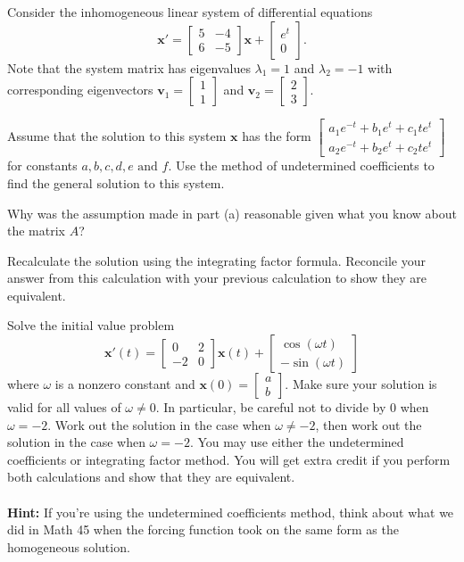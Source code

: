 \documentclass[boxes]{gsypset}
\newcommand{\m}[1]{\begin{bmatrix} #1 \end{bmatrix}}
\renewcommand{\bf}[1]{\mathbf{#1}}
\begin{document}

\begin{problem}
	Consider the inhomogeneous linear system of differential equations
	\[
		\bf{x}'=\m{5&-4\\6&-5}\bf{x}+\m{e^{t}\\0}.
	\]
	Note that the system matrix has eigenvalues $\lambda_1=1$ and
	$\lambda_2=-1$ with corresponding eigenvectors $\bf{v}_1=\m{1\\1}$
	and $\bf{v}_2=\m{2\\3}$.
	\begin{subproblems}
		\subproblem 
			Assume that the solution to this system $\bf{x}$ has the form
			$\m{a_1e^{-t}+b_1e^{t}+c_1te^{t}\\a_2e^{-t}+b_2e^{t}+c_2te^{t}}$
			for constants $a,b,c,d,e\mbox{ and }f$.  Use the method of
			undetermined coefficients to find the general solution to
			this system.
			\begin{solution}
				
			\end{solution}
		\subproblem Why was the assumption made in part (a) reasonable given
			what you know about the matrix $A$?
			\begin{solution}
				
			\end{solution}
		\subproblem Recalculate the solution using the integrating factor
			formula.  Reconcile your answer from this calculation with
			your previous calculation to show they are equivalent.
			\begin{solution}
				
			\end{solution}
	\end{subproblems}
\end{problem}

\begin{problem}
	Solve the initial value problem
	\[
		\bf{x}'(t)=\m{0&2\\-2&0}\bf{x}(t)
		+\m{\cos(\omega t)\\-\sin(\omega t)}
	\]
	where $\omega$ is a nonzero constant and
	$\bf{x}(0)=\m{a\\b}$. Make sure your solution is valid for all
	values of $\omega\neq0$.  In particular, be careful not to divide
	by 0 when $\omega=-2$.  Work out the solution in the case when
	$\omega\neq-2$, then work out the solution in the case when
	$\omega=-2$.  You may use either the undetermined coefficients or
	integrating factor method.  You will get extra credit if you
	perform both calculations and show that they are equivalent.\\\\
	\textbf{Hint:} If you're using the undetermined coefficients
	method, think about what we did in Math 45 when the forcing
	function took on the same form as the homogeneous solution.
\end{problem}
\begin{solution}
	
\end{solution}
\end{document}
